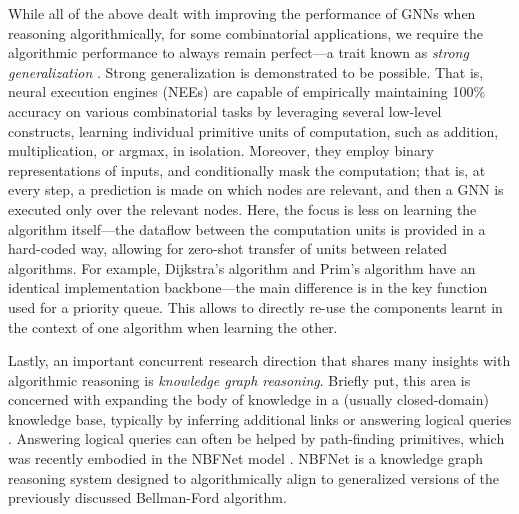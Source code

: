 \documentclass[twoside,11pt]{article}
\newcommand{\cm}[1]{{{\textcolor{orange}{\textbf{[CM:} {#1}\textbf{]}}}}}
\begin{document}
While all of the above dealt with {improving} the performance of GNNs when reasoning algorithmically, for some combinatorial applications, we require the algorithmic performance to {always} remain perfect---a trait known as \emph{strong generalization} \citep{li2020strong}. Strong generalization is demonstrated to be possible. That is, {neural execution engines} (NEEs) \citep{Yan2020} are capable of empirically maintaining 100\% accuracy on various combinatorial tasks by leveraging several low-level constructs, learning individual primitive {units of computation}, such as addition, multiplication, or argmax, in isolation. Moreover, they employ {binary} representations of inputs, and conditionally mask the computation; that is, at every step, a prediction is made on which nodes are relevant, and then a GNN is executed only over the relevant nodes. Here, the focus is less on learning the algorithm itself---the dataflow between the computation units is provided in a hard-coded way, allowing for zero-shot transfer of units between related algorithms. For example, Dijkstra's algorithm \citep{dijkstra1959note} and Prim's algorithm \citep{prim1957shortest} have an identical implementation backbone---the main difference is in the key function used for a priority queue. This allows \citet{Yan2020} to directly re-use the components learnt in the context of one algorithm when learning the other.


Lastly, an important concurrent research direction that shares many insights with algorithmic reasoning is \emph{knowledge graph reasoning}. Briefly put, this area is concerned with expanding the body of knowledge in a (usually closed-domain) knowledge base, typically by inferring additional links or answering logical queries \citep{hamilton2018embedding,ren2019query2box}. Answering logical queries can often be helped by path-finding primitives, which was recently embodied in the NBFNet model \citep{zhu2021neural}. NBFNet is a knowledge graph reasoning system designed to algorithmically align to generalized versions of the previously discussed Bellman-Ford algorithm.
\end{document}
